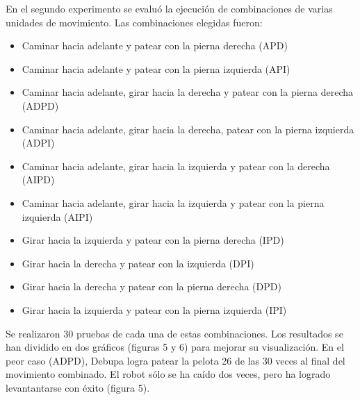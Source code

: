 \documentclass[conference, letterpaper]{IEEEtranMC1}
\begin{document}
En el segundo experimento se evalu\'o la ejecuci\'on de  combinaciones de varias unidades de movimiento. Las combinaciones elegidas fueron: 

\begin{itemize}
\setlength{\itemsep}{1pt}
\item Caminar hacia adelante y patear con la pierna derecha (APD)
\item Caminar hacia adelante y patear con la pierna izquierda (API)
\item Caminar hacia adelante, girar hacia la derecha y patear con la pierna derecha (ADPD)
\item Caminar hacia adelante, girar hacia la derecha, patear con la pierna izquierda (ADPI)
\item Caminar hacia adelante, girar hacia la izquierda y patear con la derecha (AIPD)
\item Caminar hacia adelante, girar hacia la  izquierda y  patear con la pierna izquierda (AIPI)
\item Girar hacia la izquierda y patear con la pierna derecha (IPD)
\item Girar hacia la derecha y patear con la izquierda (DPI)
\item Girar hacia la derecha y patear con la pierna derecha (DPD)
\item Girar hacia la izquierda y patear con la pierna izquierda (IPI)
 \end{itemize}


Se realizaron 30 pruebas de cada una de estas combinaciones. Los resultados se han dividido en dos gr\'aficos (figuras 5 y 6) para mejorar su visualizaci\'on.  En el peor caso (ADPD),  Debupa logra patear la pelota 26 de las 30 veces al final del movimiento combinado. El robot s\'olo se ha ca\'ido dos veces, pero ha logrado levantantarse con \'exito (figura 5).


\end{document}
